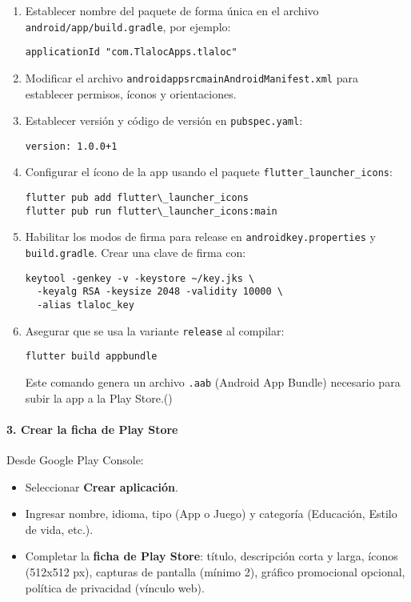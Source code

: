 \begin{enumerate}
    \item Establecer nombre del paquete de forma única en el archivo \texttt{android/app/build.gradle}, por ejemplo:
\begin{verbatim}
applicationId "com.TlalocApps.tlaloc"
\end{verbatim}

    \item Modificar el archivo \texttt{android\/app\/src\/main\/AndroidManifest.xml} para establecer permisos, íconos y orientaciones.

    \item Establecer versión y código de versión en \texttt{pubspec.yaml}:
\begin{verbatim}
version: 1.0.0+1
\end{verbatim}

    \item Configurar el ícono de la app usando el paquete \texttt{flutter\_launcher\_icons}:
\begin{verbatim}
flutter pub add flutter\_launcher_icons
flutter pub run flutter\_launcher_icons:main
\end{verbatim}

    \item Habilitar los modos de firma para release en \texttt{android\/key.properties} y \texttt{build.gradle}. Crear una clave de firma con:
\begin{verbatim}
keytool -genkey -v -keystore ~/key.jks \
  -keyalg RSA -keysize 2048 -validity 10000 \
  -alias tlaloc_key
\end{verbatim}

    \item Asegurar que se usa la variante \texttt{release} al compilar:
\begin{verbatim}
flutter build appbundle
\end{verbatim}

    Este comando genera un archivo \texttt{.aab} (Android App Bundle) necesario para subir la app a la Play Store.(\cite{AndroidSigning})
\end{enumerate}

\paragraph{3. Crear la ficha de Play Store}

Desde Google Play Console:

\begin{itemize}
    \item Seleccionar \textbf{Crear aplicación}.
    \item Ingresar nombre, idioma, tipo (App o Juego) y categoría (Educación, Estilo de vida, etc.).
    \item Completar la \textbf{ficha de Play Store}: título, descripción corta y larga, íconos (512x512 px), capturas de pantalla (mínimo 2), gráfico promocional opcional, política de privacidad (vínculo web).
\end{itemize}

